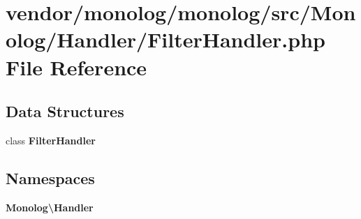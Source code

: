\section{vendor/monolog/monolog/src/\+Monolog/\+Handler/\+Filter\+Handler.php File Reference}
\label{_filter_handler_8php}
\subsection*{Data Structures}
\begin{DoxyCompactItemize}
\item 
class {\bf Filter\+Handler}
\end{DoxyCompactItemize}
\subsection*{Namespaces}
\begin{DoxyCompactItemize}
\item 
 {\bf Monolog\textbackslash{}\+Handler}
\end{DoxyCompactItemize}
